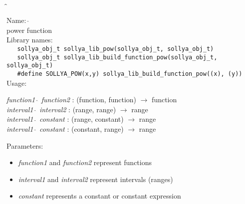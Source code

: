 \subsection{$\mathbf{\hat{~}}$}
\label{labpower}
\noindent Name: \textbf{$\mathbf{\hat{~}}$}\\
\phantom{aaa}power function\\[0.2cm]
\noindent Library names:\\
\verb|   sollya_obj_t sollya_lib_pow(sollya_obj_t, sollya_obj_t)|\\
\verb|   sollya_obj_t sollya_lib_build_function_pow(sollya_obj_t, sollya_obj_t)|\\
\verb|   #define SOLLYA_POW(x,y) sollya_lib_build_function_pow((x), (y))|\\[0.2cm]
\noindent Usage: 
\begin{center}
\emph{function1} \textbf{$\mathbf{\hat{~}}$} \emph{function2} : (\textsf{function}, \textsf{function}) $\rightarrow$ \textsf{function}\\
\emph{interval1} \textbf{$\mathbf{\hat{~}}$} \emph{interval2} : (\textsf{range}, \textsf{range}) $\rightarrow$ \textsf{range}\\
\emph{interval1} \textbf{$\mathbf{\hat{~}}$} \emph{constant} : (\textsf{range}, \textsf{constant}) $\rightarrow$ \textsf{range}\\
\emph{interval1} \textbf{$\mathbf{\hat{~}}$} \emph{constant} : (\textsf{constant}, \textsf{range}) $\rightarrow$ \textsf{range}\\
\end{center}
Parameters: 
\begin{itemize}
\item \emph{function1} and \emph{function2} represent functions
\item \emph{interval1} and \emph{interval2} represent intervals (ranges)
\item \emph{constant} represents a constant or constant expression
\end{itemize}
